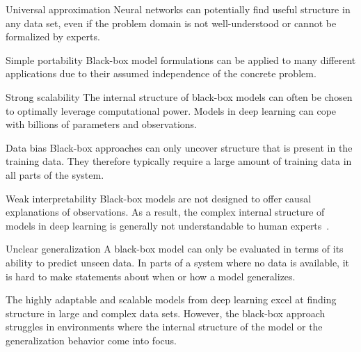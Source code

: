 \begin{Pros}
    \begin{compactdesc}
        \item[Universal approximation]
        Neural networks can potentially find useful structure in any data set, even if the problem domain is not well-understood or cannot be formalized by experts.
        \item[Simple portability]
        Black-box model formulations can be applied to many different applications due to their assumed independence of the concrete problem.
        \item[Strong scalability]
        The internal structure of black-box models can often be chosen to optimally leverage computational power.
        Models in deep learning can cope with billions of parameters and observations.
    \end{compactdesc}
\end{Pros}
\begin{Cons}
    \begin{compactdesc}
        \item[Data bias]
        Black-box approaches can only uncover structure that is present in the training data.
        They therefore typically require a large amount of training data in all parts of the system.
        \item[Weak interpretability]
        Black-box models are not designed to offer causal explanations of observations.
        As a result, the complex internal structure of models in deep learning is generally not understandable to human experts~\parencite{rudin_stop_2019}.
        \item[Unclear generalization]
        A black-box model can only be evaluated in terms of its ability to predict unseen data.
        In parts of a system where no data is available, it is hard to make statements about when or how a model generalizes.
    \end{compactdesc}
\end{Cons}

The highly adaptable and scalable models from deep learning excel at finding structure in large and complex data sets.
However, the black-box approach struggles in environments where the internal structure of the model or the generalization behavior come into focus.


